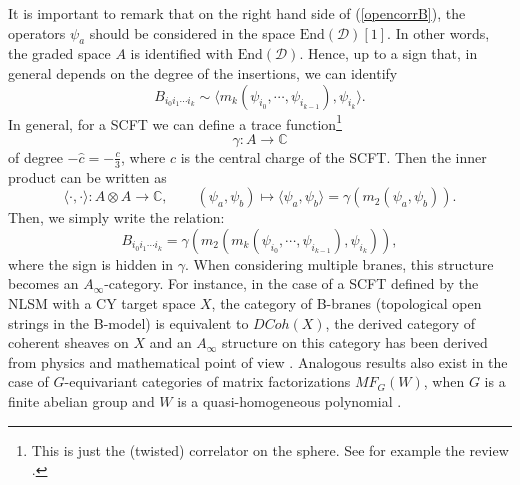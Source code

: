 \documentclass[a4paper,11pt]{article}
\numberwithin{equation}{section}
\begin{document}
It is important to remark that on the right hand side of (\ref{opencorrB}), the 
operators $\psi_{a}$ should be considered in the space 
$\mathrm{End}(\mathcal{D})[1]$. In other words, the graded space $A$ is 
identified with $\mathrm{End}(\mathcal{D})$. Hence, up to a sign that, in 
general depends on the degree of the insertions, we can identify
\begin{equation}
B_{i_0 i_1\cdots i_k} \sim  \langle 
m_k(\psi_{i_0},\cdots,\psi_{i_{k-1}}), \psi_{i_k} \rangle. 
\end{equation}
In general, for a SCFT we 
can define a trace function\footnote{This is just the (twisted) correlator on 
the sphere. See for example the review \cite{Warner:1993zh}.}
\begin{equation}
\gamma:A\rightarrow \mathbb{C}
\end{equation}
of degree $-\hat{c}=-\frac{c}{3}$, where $c$ is the central charge of the 
SCFT. Then the inner product can be written as
\begin{equation}
\langle\cdot,\cdot\rangle:A\otimes A\rightarrow \mathbb{C},\qquad 
(\psi_{a},\psi_{b})\mapsto 
\langle\psi_{a},\psi_{b}\rangle=\gamma(m_{2}(\psi_{a},\psi_{b})).
\end{equation}
Then, we simply write the relation:
\begin{equation}
B_{i_0 i_1\cdots i_k} = \gamma \left( 
m_2(m_k(\psi_{i_0},\cdots,\psi_{i_{k-1}}), \psi_{i_k}) \right),
\end{equation}
where the sign is hidden in $\gamma$.
When considering multiple branes, 
this structure becomes an $A_{\infty}$-category. For instance, in the case of a 
SCFT defined by the NLSM with a CY target space $X$, the category of B-branes 
(topological open strings in the B-model) is equivalent to $DCoh(X)$, the 
derived category of coherent sheaves on $X$ 
\cite{Sharpe:1999qz,Douglas:2000gi,Aspinwall:2001pu,Aspinwall:2009isa} 
and an $A_{\infty}$ structure on this category has been derived from physics 
and 
mathematical point of view 
\cite{Tomasiello:2001yq,Lazaroiu:2001nm,lunts2010uniqueness,bondal1990enhanced}. 
Analogous results also exist in the case of $G$-equivariant 
categories of matrix factorizations $MF_{G}(W)$, when $G$ is a finite abelian 
group and $W$ is a quasi-homogeneous polynomial 
\cite{Herbst:2004jp,Carqueville:2009ay,murfet2019constructing}.

 
\end{document}
